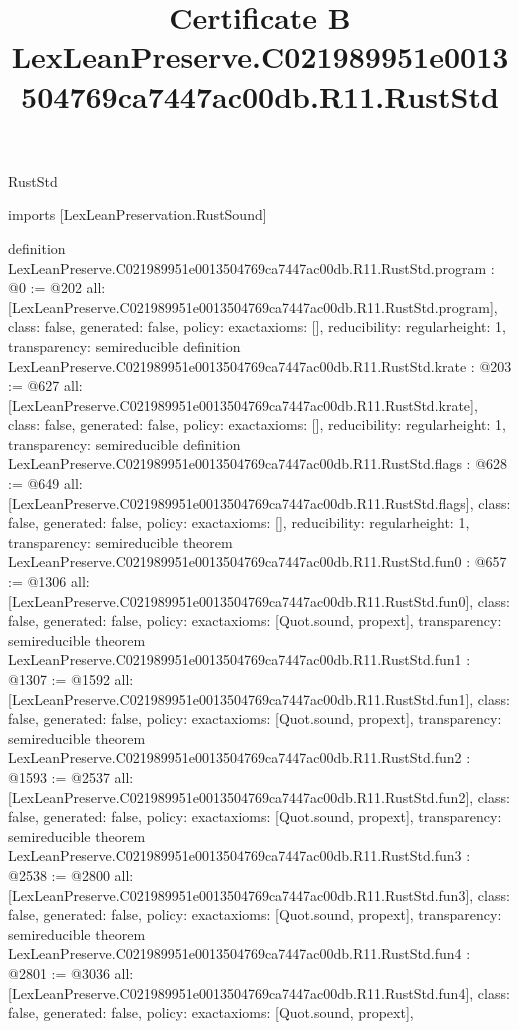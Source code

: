\begin{lexlean}{RustStd}
\title{Certificate B LexLeanPreserve.C021989951e0013504769ca7447ac00db.R11.RustStd}
\begin{coremodule}
imports [LexLeanPreservation.RustSound]

definition LexLeanPreserve.C021989951e0013504769ca7447ac00db.R11.RustStd.program : @0 := @202 {
  all: [LexLeanPreserve.C021989951e0013504769ca7447ac00db.R11.RustStd.program],
  class: false,
  generated: false,
  policy: exact{axioms: []},
  reducibility: regular{height: 1},
  transparency: semireducible
}
definition LexLeanPreserve.C021989951e0013504769ca7447ac00db.R11.RustStd.krate : @203 := @627 {
  all: [LexLeanPreserve.C021989951e0013504769ca7447ac00db.R11.RustStd.krate],
  class: false,
  generated: false,
  policy: exact{axioms: []},
  reducibility: regular{height: 1},
  transparency: semireducible
}
definition LexLeanPreserve.C021989951e0013504769ca7447ac00db.R11.RustStd.flags : @628 := @649 {
  all: [LexLeanPreserve.C021989951e0013504769ca7447ac00db.R11.RustStd.flags],
  class: false,
  generated: false,
  policy: exact{axioms: []},
  reducibility: regular{height: 1},
  transparency: semireducible
}
theorem LexLeanPreserve.C021989951e0013504769ca7447ac00db.R11.RustStd.fun0 : @657 := @1306 {
  all: [LexLeanPreserve.C021989951e0013504769ca7447ac00db.R11.RustStd.fun0],
  class: false,
  generated: false,
  policy: exact{axioms: [Quot.sound, propext]},
  transparency: semireducible
}
theorem LexLeanPreserve.C021989951e0013504769ca7447ac00db.R11.RustStd.fun1 : @1307 := @1592 {
  all: [LexLeanPreserve.C021989951e0013504769ca7447ac00db.R11.RustStd.fun1],
  class: false,
  generated: false,
  policy: exact{axioms: [Quot.sound, propext]},
  transparency: semireducible
}
theorem LexLeanPreserve.C021989951e0013504769ca7447ac00db.R11.RustStd.fun2 : @1593 := @2537 {
  all: [LexLeanPreserve.C021989951e0013504769ca7447ac00db.R11.RustStd.fun2],
  class: false,
  generated: false,
  policy: exact{axioms: [Quot.sound, propext]},
  transparency: semireducible
}
theorem LexLeanPreserve.C021989951e0013504769ca7447ac00db.R11.RustStd.fun3 : @2538 := @2800 {
  all: [LexLeanPreserve.C021989951e0013504769ca7447ac00db.R11.RustStd.fun3],
  class: false,
  generated: false,
  policy: exact{axioms: [Quot.sound, propext]},
  transparency: semireducible
}
theorem LexLeanPreserve.C021989951e0013504769ca7447ac00db.R11.RustStd.fun4 : @2801 := @3036 {
  all: [LexLeanPreserve.C021989951e0013504769ca7447ac00db.R11.RustStd.fun4],
  class: false,
  generated: false,
  policy: exact{axioms: [Quot.sound, propext]},
}
\end{coremodule}
\end{lexlean}
